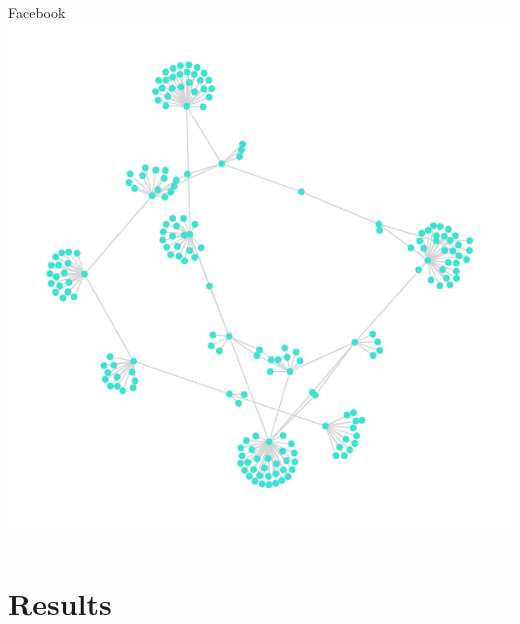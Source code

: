 \documentclass{beamer}
\begin{document}
\begin{frame}
\begin{columns}
\begin{column}[t]{0.5\textwidth}
\begin{block}{Facebook}
        \includegraphics[scale=0.3]{fig/facebook_ff}
      \end{block}
    \end{column}
  \end{columns}
  
\end{frame}



\section{Results}
\begin{frame}
\end{frame}


\end{document}
